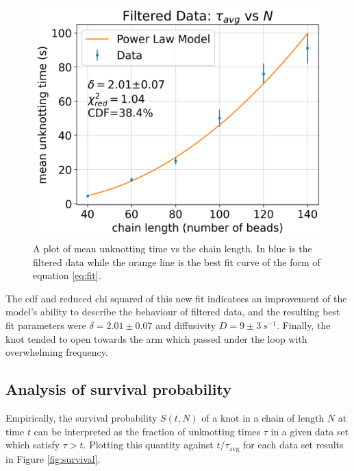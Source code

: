 \documentclass[11pt]{article}
\begin{document}
        \begin{figure}[h]
            \centering
            \includegraphics[scale=0.55]{filtered.png}
            \caption{A plot of mean unknotting time vs the chain length. In blue is the filtered
            data while the orange line is the best fit curve of the form of equation \ref{eq:fit}.}
            \label{fig:filtered}
        \end{figure}
    The cdf and reduced chi squared of this new fit indicatees an improvement of the model's ability 
    to describe the behaviour of filtered data, and the resulting best fit parameters were 
    $\delta = 2.01 \pm 0.07$ and diffusivity $D= 9 \pm 3~\unit{s}^{-1}$. 
    Finally, the knot tended to open towards the arm which passed under the loop with overwhelming frequency.
    
    \subsection{Analysis of survival probability}

    Empirically, the survival probability $S(t,N)$ of a knot in a chain of length 
    $N$ at time $t$ can be interpreted as the fraction of unknotting times $\tau$ in a 
    given data set which satisfy $\tau > t$. Plotting this quantity against $t/\tau_\text{avg}$ for each data 
    set results in Figure \ref{fig:survival}.\\
     
\end{document}
